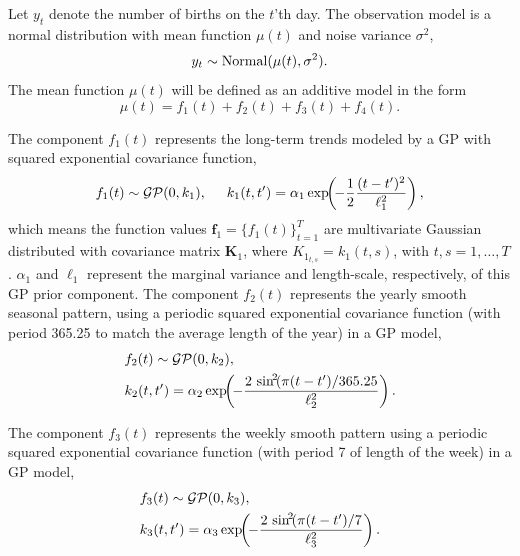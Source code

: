 Let $y_t$ denote the number of births on the $t$'th day. The observation model is a normal distribution with mean function $\mu(t)$ and noise variance $\sigma^2$,
%
\begin{equation*}
y_{t} \sim \operatorname{Normal}(\mu(t),\sigma^2).
\end{equation*}
%
The mean function $\mu(t)$ will be defined as an additive model in the form
%
\begin{equation} \label{eq_mean_brithday}
\mu(t) = f_1(t) + f_2(t) + f_3(t) + f_4(t).
\end{equation}

The component $f_1(t)$ represents the long-term trends modeled by a GP with squared exponential covariance function,
%
\begin{equation*}
f_1(t) \sim \operatorname{\mathcal{GP}}(0,k_1), \hspace{5mm} k_1(t,t') = \alpha_1 \exp\!\!\left(\!-\frac{1}{2} \frac{(t-t')^2}{\ell_1^2}\right), 
\end{equation*}
%
which means the function values $\bm{f}_1=\{f_1(t)\}_{t=1}^T$ are multivariate Gaussian distributed with covariance matrix $\bm{K}_1$, where $K_{1_{t,s}}=k_1(t,s)$, with $t,s=1,\dots,T$. $\alpha_1$ and $\ell_1$ represent the marginal variance and length-scale, respectively, of this GP prior component. 
The component $f_2(t)$ represents the yearly smooth seasonal pattern, using a periodic squared exponential covariance function (with period 365.25 to match the average length of the year) in a GP model,
%
\begin{align*}
&f_2(t) \sim \operatorname{\mathcal{GP}}(0,k_2), \\
&k_2(t,t') = \alpha_2 \exp\!\!\left(\!-\frac{2\,\sin^{\!2}\!(\pi(t-t')/365.25}{\ell_2^2}\right).
\end{align*}

The component $f_3(t)$ represents the weekly smooth pattern using a periodic squared exponential covariance function (with period 7 of length of the week) in a GP model,
%
\begin{align*}
&f_3(t) \sim \operatorname{\mathcal{GP}}(0,k_3), \\
&k_3(t,t') = \alpha_3 \exp\!\!\left(\!-\frac{2\,\sin^{\!2}\!(\pi(t-t')/7}{\ell_3^2}\right). 
\end{align*}

